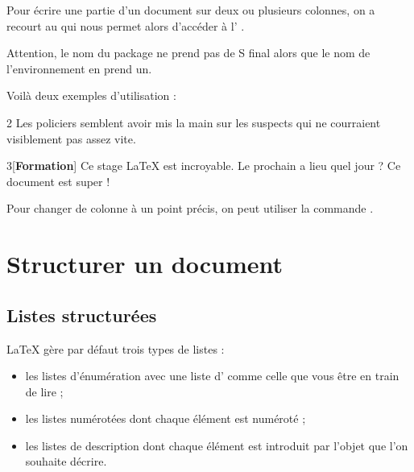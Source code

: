 \documentclass[10pt,french]{book}
\begin{document}
Pour écrire une partie d'un document sur deux ou plusieurs colonnes, on a recourt au \package {} qui nous permet alors d'accéder à l' .

\begin{info}
    Attention, le nom du package ne prend pas de S final alors que le nom de l'environnement en prend un.
\end{info}

Voilà deux exemples d'utilisation :\bigskip

{\NewFont
\begin{SideBySideExample}
    \setlength{\columnseprule}{0.4mm}
    \begin{multicols}{2}
        Les policiers semblent avoir mis la main
        sur les suspects qui ne courraient
        visiblement pas assez vite.
    \end{multicols}
\end{SideBySideExample}
\bigskip}

{\NewFont
\begin{SideBySideExample}
    \setlength{\columnseprule}{0.4pt}
    \begin{multicols}{3}[\textbf{Formation}]
        Ce stage \LaTeX{} est incroyable.
        Le prochain a lieu quel jour ? Ce
        document est super !
    \end{multicols}
\end{SideBySideExample}
\bigskip}

\begin{info}
    Pour changer de colonne à un point précis, on peut utiliser la commande .
\end{info}

\section{Structurer un document}
\subsection{Listes structurées}

\LaTeX{} gère par défaut trois types de listes :
\begin{itemize}[label=$-$]
    \item les listes d'énumération avec une liste d' comme celle que vous être en train de lire ;
    \item les listes numérotées dont chaque élément est numéroté ;
    \item les listes de description dont chaque élément est introduit par l'objet que l'on souhaite décrire.
\end{itemize}
\end{document}
